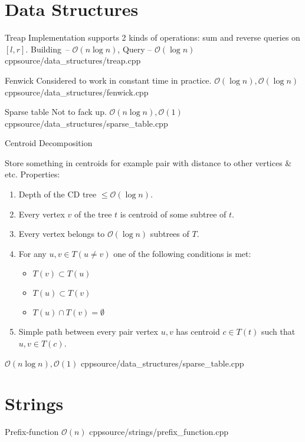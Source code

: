 \documentclass[landscape, 10pt, a4paper, oneside, twocolumn]{extarticle}
\begin{document}
\section{Data Structures}

\Algorithm
{Treap}
{Implementation supports 2 kinds of operations: sum and reverse queries on $[l, r]$.}
{Building – $\mathcal{O}(n \log n)$, Query – $\mathcal{O}(\log n)$}
{cpp}{source/data_structures/treap.cpp}

\Algorithm
{Fenwick}
{Considered to work in constant time in practice.}
{$\mathcal{O}(\log n), \mathcal{O}(\log n)$}
{cpp}{source/data_structures/fenwick.cpp}

\Algorithm
{Sparse table}
{Not to fack up.}
{$\mathcal{O}(n \log n), \mathcal{O}(1)$}
{cpp}{source/data_structures/sparse_table.cpp}

\Algorithm
{Centroid Decomposition}
{Store something in centroids for example pair with distance to other vertices & etc.
Properties:
    \begin{enumerate}
        \item Depth of the CD tree $ \leq \mathcal{O}(\log n)$.
        \item Every vertex $v$ of the tree $t$ is centroid of some subtree of $t$.
        \item Every vertex belongs to $\mathcal{O}(\log n)$ subtrees of $T$.
        \item For any $u, v \in T (u \neq v)$ one of the following conditions is met:
            \begin{itemize}
                \item $T(v) \subset T(u)$
                \item $T(u) \subset T(v)$
                \item $T(u) \cap T(v) = \emptyset $
            \end{itemize}
        \item Simple path between every pair vertex $u, v$ has centroid $c \in T(t)$ such that $u, v \in T(c)$. 
    \end{enumerate}
}
{$\mathcal{O}(n \log n), \mathcal{O}(1)$}
{cpp}{source/data_structures/sparse_table.cpp}


\section{Strings}

\Algorithm
{Prefix-function}
{}
{$\mathcal{O}(n)$}
{cpp}{source/strings/prefix_function.cpp}
\end{document}
